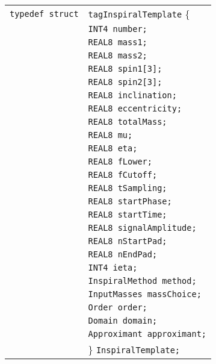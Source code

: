 \documentclass[12pt]{article}
\begin{document}
\begin{tabular}{ll}
\texttt{typedef struct} & \texttt{tagInspiralTemplate} \{ \\
                        & \texttt{INT4 number;} \\
                        & \texttt{REAL8 mass1;} \\
                        & \texttt{REAL8 mass2;}  \\
                        & \texttt{REAL8 spin1[3];}  \\
                        & \texttt{REAL8 spin2[3];}  \\
                        & \texttt{REAL8 inclination;} \\
                        & \texttt{REAL8 eccentricity;} \\
                        & \texttt{REAL8 totalMass;} \\
                        & \texttt{REAL8 mu;}  \\
                        & \texttt{REAL8 eta;}  \\
                        & \texttt{REAL8 fLower;}  \\
                        & \texttt{REAL8 fCutoff;} \\
                        & \texttt{REAL8 tSampling;} \\
                        & \texttt{REAL8 startPhase;} \\
                        & \texttt{REAL8 startTime;} \\
                        & \texttt{REAL8 signalAmplitude;} \\
                        & \texttt{REAL8 nStartPad;} \\
                        & \texttt{REAL8 nEndPad;} \\
                        & \texttt{INT4 ieta;} \\
                        & \texttt{InspiralMethod method;}  \\
                        & \texttt{InputMasses massChoice;}  \\
                        & \texttt{Order order;}  \\
                        & \texttt{Domain domain;}  \\
                        & \texttt{Approximant approximant;}  \\
                        & \} \texttt{InspiralTemplate;}
\end{tabular}

\vspace{5mm}
\end{document}
